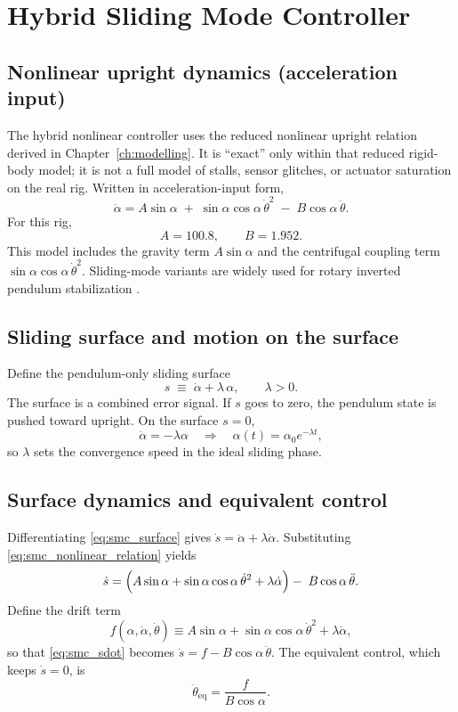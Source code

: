 \chapter{Hybrid Sliding Mode Controller}
\label{ch:smc}

\section{Nonlinear upright dynamics (acceleration input)}
The hybrid nonlinear controller uses the reduced nonlinear upright relation derived in Chapter~\ref{ch:modelling}. It is ``exact'' only within that reduced rigid-body model; it is not a full model of stalls, sensor glitches, or actuator saturation on the real rig. Written in acceleration-input form,
\begin{equation}
\ddot{\alpha}
=
A\sin\alpha
\;+\;
\sin\alpha\cos\alpha\,\dot{\theta}^2
\;-\;
B\cos\alpha\,\ddot{\theta}.
\label{eq:smc_nonlinear_relation}
\end{equation}
For this rig,
\[
A=100.8,\qquad B=1.952.
\]
This model includes the gravity term $A\sin\alpha$ and the centrifugal coupling term $\sin\alpha\cos\alpha\,\dot{\theta}^2$. Sliding-mode variants are widely used for rotary inverted pendulum stabilization \cite{Yigit2017,Nguyen2020,Pham2024}.

\section{Sliding surface and motion on the surface}
Define the pendulum-only sliding surface
\begin{equation}
s \;\equiv\; \dot{\alpha} + \lambda\,\alpha,\qquad \lambda>0.
\label{eq:smc_surface}
\end{equation}
The surface is a combined error signal. If $s$ goes to zero, the pendulum state is pushed toward upright. On the surface $s=0$,
\[
\dot{\alpha}=-\lambda\alpha \quad\Rightarrow\quad \alpha(t)=\alpha_0 e^{-\lambda t},
\]
so $\lambda$ sets the convergence speed in the ideal sliding phase.

\section{Surface dynamics and equivalent control}
Differentiating \eqref{eq:smc_surface} gives $\dot{s}=\ddot{\alpha}+\lambda\dot{\alpha}$. Substituting \eqref{eq:smc_nonlinear_relation} yields
\begin{equation}
\dot{s}
=
\Bigl(A\sin\alpha+\sin\alpha\cos\alpha\,\dot{\theta}^2+\lambda\dot{\alpha}\Bigr)
-\;B\cos\alpha\,\ddot{\theta}.
\label{eq:smc_sdot}
\end{equation}
Define the drift term
\[
f(\alpha,\dot{\alpha},\dot{\theta}) \equiv A\sin\alpha+\sin\alpha\cos\alpha\,\dot{\theta}^2+\lambda\dot{\alpha},
\]
so that \eqref{eq:smc_sdot} becomes $\dot{s}=f-B\cos\alpha\,\ddot{\theta}$. The equivalent control, which keeps $\dot{s}=0$, is
\begin{equation}
\ddot{\theta}_{\mathrm{eq}}=\frac{f}{B\cos\alpha}.
\label{eq:smc_eq_control}
\end{equation}

